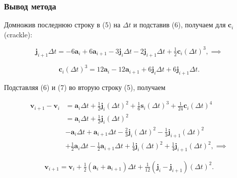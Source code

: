 \begin{frame}
\frametitle{Вывод метода}

Домножив последнюю строку в (5) на $ \Delta t $ и подставив (6), получаем для $ \mathbf{c}_i $ (crackle):

\su\su\su
\begin{equation*}
  \mathbf{j}_{i+1} \Delta t = -6 \mathbf{a}_i + 6 \mathbf{a}_{i+1} - 3 \mathbf{j}_i \Delta t - 2 \mathbf{j}_{i+1} \Delta t + \tfrac{1}{2} \mathbf{c}_i (\Delta t)^3, \implies
\end{equation*}

\su\su\su
\begin{equation}
  \mathbf{c}_i (\Delta t)^3 = 12 \mathbf{a}_i - 12 \mathbf{a}_{i+1} + 6 \mathbf{j}_i \Delta t + 6 \mathbf{j}_{i+1} \Delta t.
\end{equation}

Подставляя (6) и (7) во вторую строку (5), получаем

\su\su\su
\begin{align*}
  \mathbf{v}_{i+1} - \mathbf{v}_i & = \mathbf{a}_i \Delta t + \tfrac{1}{2} \mathbf{j}_i (\Delta t)^2 + \tfrac{1}{6} \mathbf{s}_i (\Delta t)^3 + \tfrac{1}{24} \mathbf{c}_i (\Delta t)^4 \\
                                  & = \mathbf{a}_i \Delta t + \tfrac{1}{2} \mathbf{j}_i (\Delta t)^2 \\
                                  & - \mathbf{a}_i \Delta t + \mathbf{a}_{i+1} \Delta t - \tfrac{2}{3} \mathbf{j}_i (\Delta t)^2 - \tfrac{1}{3} \mathbf{j}_{i+1} (\Delta t)^2 \\
                                  & + \tfrac{1}{2} \mathbf{a}_i \Delta t - \tfrac{1}{2} \mathbf{a}_{i+1} \Delta t + \tfrac{1}{4} \mathbf{j}_i (\Delta t)^2 + \tfrac{1}{4} \mathbf{j}_{i+1} (\Delta t)^2, \implies
\end{align*}

\su\su\su
\begin{equation}
  \mathbf{v}_{i+1} = \mathbf{v}_i + \tfrac{1}{2} (\mathbf{a}_i + \mathbf{a}_{i+1}) \Delta t + \tfrac{1}{12} (\mathbf{j}_i - \mathbf{j}_{i+1}) (\Delta t)^2.
\end{equation}

\end{frame}

